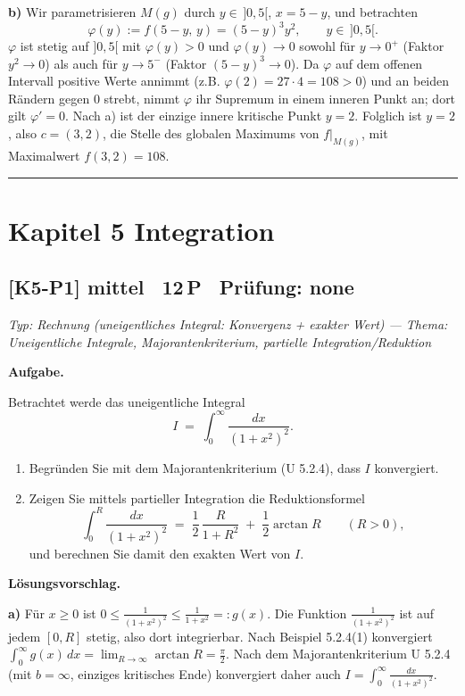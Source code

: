 \documentclass[a4paper,11pt]{article}
\begin{document}
\textbf{b)} Wir parametrisieren $M(g)$ durch $y\in\,]0,5[$, $x=5-y$, und betrachten
\[ \varphi(y):=f(5-y,\,y)=(5-y)^3y^2,\qquad y\in\,]0,5[. \]
$\varphi$ ist stetig auf $]0,5[$ mit $\varphi(y)>0$ und $\varphi(y)\to 0$ sowohl für $y\to0^+$ (Faktor $y^2\to0$) als auch für $y\to5^-$ (Faktor $(5-y)^3\to0$). Da $\varphi$ auf dem offenen Intervall positive Werte annimmt (z.B. $\varphi(2)=27\cdot4=108>0$) und an beiden Rändern gegen $0$ strebt, nimmt $\varphi$ ihr Supremum in einem inneren Punkt an; dort gilt $\varphi'=0$. Nach a) ist der einzige innere kritische Punkt $y=2$. Folglich ist $y=2$, also $c=(3,2)$, die Stelle des globalen Maximums von $f|_{M(g)}$, mit Maximalwert $f(3,2)=108$.\par\bigskip\hrule\bigskip
\section*{Kapitel 5 \quad Integration}
\subsection*{[K5-P1] \normalfont mittel \textbullet\ 12\,P \textbullet\ Pr\"ufung: none}
\textit{Typ: Rechnung (uneigentliches Integral: Konvergenz + exakter Wert)  ---  Thema: Uneigentliche Integrale, Majorantenkriterium, partielle Integration/Reduktion}\par\smallskip
\textbf{Aufgabe.}\par
Betrachtet werde das uneigentliche Integral
\[ I \;=\; \int_{0}^{\infty} \frac{dx}{(1+x^{2})^{2}}. \]
\begin{enumerate}[label=\alph*)]
  \item Begründen Sie mit dem Majorantenkriterium (U 5.2.4), dass $I$ konvergiert.
  \item Zeigen Sie mittels partieller Integration die Reduktionsformel
  \[ \int_{0}^{R} \frac{dx}{(1+x^{2})^{2}} \;=\; \frac{1}{2}\,\frac{R}{1+R^{2}} \;+\; \frac{1}{2}\arctan R \qquad (R>0), \]
  und berechnen Sie damit den exakten Wert von $I$.
\end{enumerate}\par\smallskip
\textbf{L\"osungsvorschlag.}\par
\textbf{a)} Für $x\ge 0$ ist $0\le \frac{1}{(1+x^{2})^{2}}\le \frac{1}{1+x^{2}}=:g(x)$. Die Funktion $\frac{1}{(1+x^2)^2}$ ist auf jedem $[0,R]$ stetig, also dort integrierbar. Nach Beispiel 5.2.4(1) konvergiert $\int_{0}^{\infty} g(x)\,dx=\lim_{R\to\infty}\arctan R=\frac{\pi}{2}$. Nach dem Majorantenkriterium U 5.2.4 (mit $b=\infty$, einziges kritisches Ende) konvergiert daher auch $I=\int_0^\infty \frac{dx}{(1+x^2)^2}$.
\end{document}
